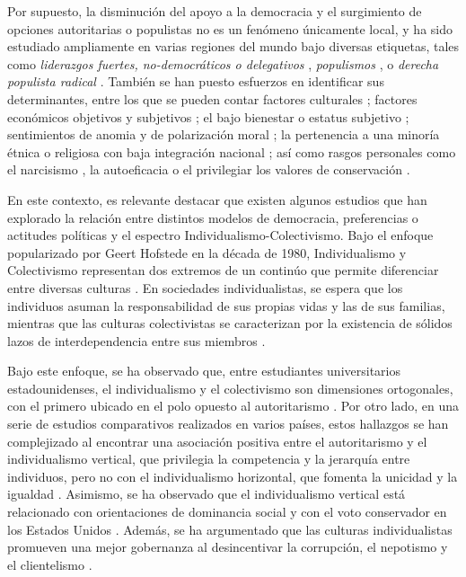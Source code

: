 \documentclass[12pt,oneside]{templates/facsothesis}
\begin{document}
Por supuesto, la disminución del apoyo a la democracia y el surgimiento de opciones autoritarias o populistas no es un fenómeno únicamente local, y ha sido estudiado ampliamente en varias regiones del mundo bajo diversas etiquetas, tales como \emph{liderazgos fuertes, no-democráticos o delegativos} \citep{carlin2011, carlin2018, crimston2022, kang2018, lima2021, selvanathan2022, xuereb2021}, \emph{populismos} \citep{baro2022, gidron2020, nowakowski2021}, o \emph{derecha populista radical} \citep{diaz2023, donovan2019, donovan2021}. También se han puesto esfuerzos en identificar sus determinantes, entre los que se pueden contar factores culturales \citep{lima2021, marchlewska2022, selvanathan2022}; factores económicos objetivos y subjetivos \citep{arikan2019, rico2020, wu2019, xuereb2021}; el bajo bienestar o estatus subjetivo \citep{gidron2020, nowakowski2021}; sentimientos de anomia y de polarización moral \citep{crimston2022}; la pertenencia a una minoría étnica o religiosa con baja integración nacional \citep{eskelinen2020}; así como rasgos personales como el narcisismo \citep{marchlewska2019}, la autoeficacia \citep{rico2020} o el privilegiar los valores de conservación \citep{baro2022}.

En este contexto, es relevante destacar que existen algunos estudios que han explorado la relación entre distintos modelos de democracia, preferencias o actitudes políticas y el espectro Individualismo-Colectivismo. Bajo el enfoque popularizado por Geert Hofstede en la década de 1980, Individualismo y Colectivismo representan dos extremos de un continúo que permite diferenciar entre diversas culturas \citep{oyserman2002}. En sociedades individualistas, se espera que los individuos asuman la responsabilidad de sus propias vidas y las de sus familias, mientras que las culturas colectivistas se caracterizan por la existencia de sólidos lazos de interdependencia entre sus miembros \citep{yoon2010}.

Bajo este enfoque, se ha observado que, entre estudiantes universitarios estadounidenses, el individualismo y el colectivismo son dimensiones ortogonales, con el primero ubicado en el polo opuesto al autoritarismo \citep{gelfand1996}. Por otro lado, en una serie de estudios comparativos realizados en varios países, estos hallazgos se han complejizado al encontrar una asociación positiva entre el autoritarismo y el individualismo vertical, que privilegia la competencia y la jerarquía entre individuos, pero no con el individualismo horizontal, que fomenta la unicidad y la igualdad \citep{kemmelmeier2003}. Asimismo, se ha observado que el individualismo vertical está relacionado con orientaciones de dominancia social \citep{strunk1999} y con el voto conservador en los Estados Unidos \citep{zhang2009}. Además, se ha argumentado que las culturas individualistas promueven una mejor gobernanza al desincentivar la corrupción, el nepotismo y el clientelismo \citep{kyriacou2016}.
\end{document}
